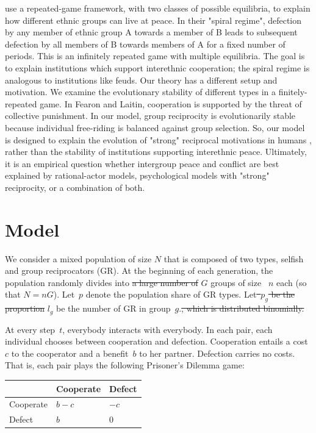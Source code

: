 \documentclass[12pt,a4paper]{article}
\newcommand{\mm}[1]{{\color{red} #1}}
\begin{document}
\textcite{fearon1996explaining} use a repeated-game framework, with 
two classes of possible equilibria, to explain how
different ethnic groups can live at peace. In their "spiral regime", defection
by any member of ethnic group A towards a member of B leads to subsequent 
defection by all members of B towards members of A for a fixed number of periods.
This is an infinitely repeated game with multiple equilibria. The goal is to explain
institutions which support interethnic cooperation; the spiral regime is analogous
to institutions like feuds. Our theory has a different setup and motivation. 
We examine the evolutionary stability of different types in a finitely-repeated game. 
In Fearon and Laitin, cooperation is supported by the threat of collective 
punishment. In our model, group reciprocity is evolutionarily stable because 
individual free-riding is balanced against group selection. So, our model
is designed to explain the evolution of "strong" reciprocal
motivations in humans \parencite{gintis2000strong}, rather than the 
stability of institutions supporting interethnic peace. Ultimately, it is an 
empirical question whether intergroup peace and conflict are best explained 
by rational-actor models, psychological models with "strong" reciprocity,
or a combination of both.

\section{Model}

We consider a mixed population of \mm{size $N$ that is composed of }two types, selfish and group reciprocators (GR). At the beginning of each generation, the population randomly divides into \sout{a large number of} \mm{$G$} groups of size~\mm{$n$} each \mm{(so that $N=nG$)}.
Let~$p$ denote the population share of GR types. 
Let\sout{~$p_g$ be the proportion} \mm{$l_g$ be the number} of GR in group~$g$.\sout{, which is distributed binomially.}

At every step~$t$, everybody interacts with everybody. In each pair, each individual chooses between cooperation and defection. Cooperation entails a cost~$c$ to the cooperator and a benefit~$b$ to her partner. Defection carries no costs. That is, each pair plays the following Prisoner's Dilemma game:
\begin{center}
    \begin{tabularx}{0.5\textwidth}{|x|x|x|}
        \hline
        &   Cooperate   &   Defect  \\
        \hline
        Cooperate   &   $b-c$   &   $-c$    \\
        \hline
        Defect  &   $b$ &   $0$   \\
        \hline
    \end{tabularx}
\end{center}
\end{document}
